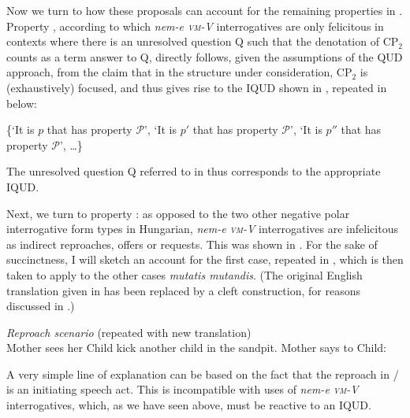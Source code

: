 \documentclass[output=paper,colorlinks,citecolor=brown]{langscibook}
\begin{document}
	Now we turn to how these proposals can account for  the remaining  properties in . Property , according to which \textit{nem-e \textsc{vm}-V} interrogatives are only felicitous in contexts where there is an unresolved
	question Q such that the denotation of  CP$_2$ counts as a term answer to Q, directly follows, given the assumptions of the QUD approach,  from the claim that in the structure under consideration,  CP$_2$ is (exhaustively) focused, and thus gives rise to the IQUD shown in , repeated in  below:
	
	\ea\label{ex:QUD-den1} \{`It is $p$ that has property $\mathcal{P}$', `It is $p'$ that has property $\mathcal{P}$', `It is $p''$ that has property $\mathcal{P}$', \dots\}
	\z
	
	The unresolved question Q referred to in  thus corresponds to the appropriate IQUD. 

	Next, we turn to property : as opposed to the two other negative polar interrogative form types in Hungarian, \textit{nem-e \textsc{vm}-V} interrogatives are infelicitous as indirect reproaches, offers or requests. This was shown in . For the sake of succinctness, I will sketch an account for the first case, repeated in , which is then taken to apply to the other cases \textit{mutatis mutandis}. (The original English  translation given in  has been replaced by a cleft construction, for reasons discussed in .)
	
	
	\ea\label{ex:mother1}
	\textit{Reproach scenario} (repeated with new translation)\\
	Mother sees her Child kick another child in the sandpit. Mother says to Child:
	\label{ex:mothera1}
	\label{ex:motherb1}
	\label{ex:motherc1}
	\z
	\z
	
	A very simple line of explanation can be based on the fact that the reproach in / is an initiating speech act. This is incompatible with uses of \textit{nem-e \textsc{vm}-V}  interrogatives, which, as we have seen above, must be reactive to an IQUD.
	
\end{document}

